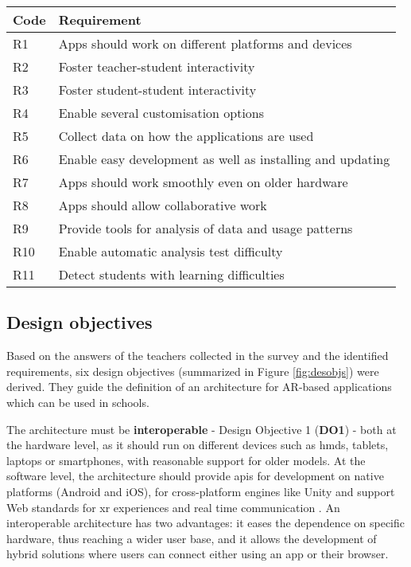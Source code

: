 \begin{table*}[ht]\centering
\caption{\fontsize{10pt}{11pt}}
\begin{tabular}{p{}>{\arraybackslash}p{}}
\toprule
Code & Requirement\\
\midrule
R1 & Apps should work on different platforms and devices\\
R2 & Foster teacher-student interactivity\\
R3 &  Foster student-student interactivity\\
R4 & Enable several customisation options\\
R5 & Collect data on how the applications are used\\
R6 & Enable easy development as well as installing and updating\\
R7 & Apps should work smoothly even on older hardware\\
R8 & Apps should allow collaborative work\\
R9 & Provide tools for analysis of data and usage patterns\\
R10 & Enable automatic analysis test difficulty \\
R11 & Detect students with learning difficulties \\
\bottomrule
\end{tabular}
\label{arch:tab:summaryreqs}
\end{table*}

\subsection{Design objectives}\label{arch:req:desobj}

Based on the answers of the teachers collected in the survey and the identified requirements, six design objectives (summarized in Figure \ref{fig:desobjs})  were derived. They guide the definition of an architecture for AR-based applications which can be used in schools.

The architecture must be \textbf{interoperable} - Design Objective 1 (\textbf{DO1}) - both at the hardware level, as it should run on different devices such as \glspl{hmd}, tablets, laptops or smartphones, with reasonable support for older models. At the software level, the architecture should provide \glspl{api} for development on native platforms (Android and iOS), for cross-platform engines like Unity and support Web standards for \gls{xr} experiences \citep{Goregaokar:22:WDA} and real time communication \citep{rfc7478}. An interoperable architecture has two advantages: it eases the dependence on specific hardware, thus reaching a wider user base, and it allows the development of hybrid solutions where users can connect either using an app or their browser.

